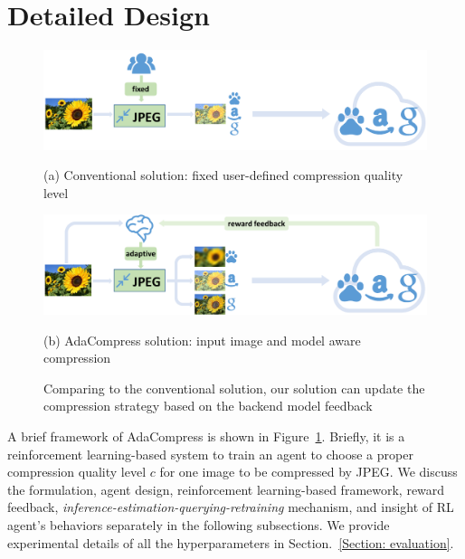 \section{Detailed Design}
\label{Section: design}

\begin{figure}
	\begin{minipage}{\linewidth}
		\centerline{\includegraphics[width=0.8\linewidth]{figures/conventional-framework.pdf}}
		\begin{center}
			{(a) Conventional solution: fixed user-defined compression quality level}
		\end{center}
	\end{minipage}
	\vfill
	\vspace{0.4cm}
	\begin{minipage}{\linewidth}
		\centerline{\includegraphics[width=0.8\linewidth]{figures/adaptive-framework.pdf}}
		\vspace{0.2cm}
		\begin{center}
			{(b) AdaCompress solution: input image and model aware compression}
		\end{center}
	\end{minipage}
	\vspace{0.1cm}
	\caption{Comparing to the conventional solution, our solution can update the compression strategy based on the backend model feedback}
	\label{fig: framework}
\end{figure}

A brief framework of AdaCompress is shown in Figure~\ref{fig: framework}. Briefly, it is a reinforcement learning-based system to train an agent to choose a proper compression quality level $ c $ for one image to be compressed by JPEG. We discuss the formulation, agent design, reinforcement learning-based framework, reward feedback, \emph{inference-estimation-querying-retraining} mechanism, and insight of RL agent's behaviors separately in the following subsections. We provide experimental details of all the hyperparameters in Section.~\ref{Section: evaluation}. %

